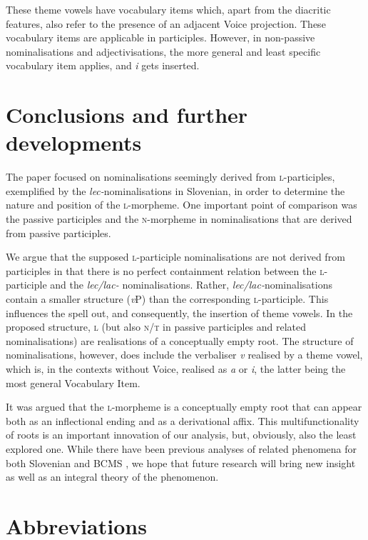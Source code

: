 \documentclass[output=paper,colorlinks,citecolor=brown]{langscibook}
\begin{document}
\z 

\noindent These theme vowels have vocabulary items which, apart from the diacritic features, also refer to the presence of an adjacent Voice projection. These vocabulary items are applicable in participles. However, in non-passive nominalisations and adjectivisations, the more general and least specific vocabulary item applies, and \textit{i} gets inserted.



\section{Conclusions and further developments}\label{sec:conclusions}
The paper focused on nominalisations seemingly derived from \textsc{l}-participles, exemplified by the \textit{lec-}nominalisations in Slovenian, in order to determine the nature and position of the \textsc{l}-morpheme. One important point of comparison was the passive participles and the \textsc{n}-morpheme in nominalisations that are derived from passive participles.


We argue that the supposed \textsc{l}-participle nominalisations are not derived from participles in that there is no perfect containment relation between the \textsc{l}-par\-ti\-ci\-ple and the \textit{lec/lac-} nominalisations. Rather, \textit{lec/lac-}nominalisations contain a smaller structure (\textit{v}P) than the corresponding \textsc{l}-participle. This influences the spell out, and consequently, the insertion of theme vowels. In the proposed structure, \textsc{l} (but also \textsc{n/t} in passive participles and related nominalisations) are realisations of a conceptually empty root. 
The structure of nominalisations, however, does include the verbaliser \textit{v} realised by a theme vowel, which is, in the contexts without Voice, realised as \textit{a} or \textit{i}, the latter being the most general Vocabulary Item. 

It was argued that the \textsc{l}-morpheme is a conceptually empty root that can appear both as an inflectional ending and as a derivational affix. This  
multifunctionality of roots is 
an important innovation of our analysis, but, obviously, also the least explored one. While there have been previous analyses of related phenomena for both Slovenian and BCMS \citep[]{SimArs2014,simonovic2017syntax, simonovic2020ov}, we hope that future research will bring new insight as well as an integral theory of the phenomenon.


\section*{Abbreviations}
\end{document}
